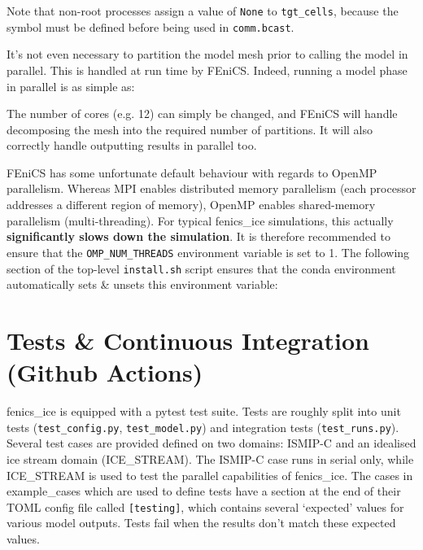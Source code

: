\documentclass[11pt, reqno, nocenter]{article}
\begin{document}
Note that non-root processes assign a value of {\tt None} to {\tt tgt\_cells}, because the symbol must be defined before being used in {\tt comm.bcast}.

It's not even necessary to partition the model mesh prior to calling the model in parallel. This is handled at run time by FEniCS. Indeed, running a model phase in parallel is as simple as:
{
}%

The number of cores (e.g. 12) can simply be changed, and FEniCS will handle decomposing the mesh into the required number of partitions. It will also correctly handle outputting results in parallel too.

FEniCS has some unfortunate default behaviour with regards to OpenMP parallelism. Whereas MPI enables distributed memory parallelism (each processor addresses a different region of memory), OpenMP enables shared-memory parallelism (multi-threading). For typical fenics\_ice simulations, this actually \textbf{significantly slows down the simulation}. It is therefore recommended to ensure that the {\tt OMP\_NUM\_THREADS} environment variable is set to 1. The following section of the top-level {\tt install.sh} script ensures that the conda environment automatically sets \& unsets this environment variable:


\section{Tests \& Continuous Integration (Github Actions)} \label{sec:test}

fenics\_ice is equipped with a pytest test suite. Tests are roughly split into unit tests (\texttt{test\_config.py}, \texttt{test\_model.py}) and integration tests (\texttt{test\_runs.py}). Several test cases are provided defined on two domains: ISMIP-C and an idealised ice stream domain (ICE\_STREAM). The ISMIP-C case runs in serial only, while ICE\_STREAM is used to test the parallel capabilities of fenics\_ice. The cases in example\_cases which are used to define tests have a section at the end of their TOML config file called \texttt{[testing]}, which contains several `expected' values for various model outputs. Tests fail when the results don't match these expected values.
\end{document}
